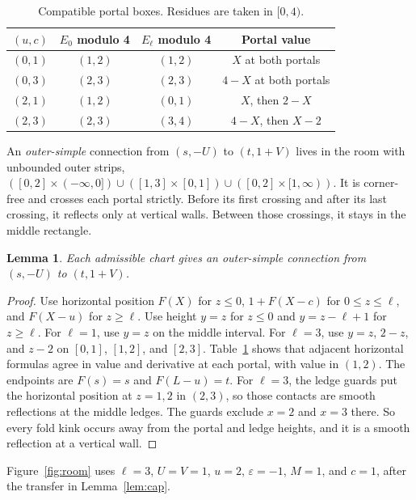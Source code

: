 \documentclass[11pt]{article}
\newtheorem{lemma}{Lemma}
\theoremstyle{remark}
\begin{document}
\begin{table}[ht]
\centering
\begin{tabular}{cccc}
\hline
$(u,c)$ & $E_0$ modulo 4 & $E_\ell$ modulo 4 & Portal value\\
\hline
$(0,1)$ & $(1,2)$ & $(1,2)$ & $X$ at both portals\\
$(0,3)$ & $(2,3)$ & $(2,3)$ & $4-X$ at both portals\\
$(2,1)$ & $(1,2)$ & $(0,1)$ & $X$, then $2-X$\\
$(2,3)$ & $(2,3)$ & $(3,4)$ & $4-X$, then $X-2$\\
\hline
\end{tabular}
\caption{Compatible portal boxes. Residues are taken in $[0,4)$.}
\label{tab:boxes}
\end{table}

An \emph{outer-simple} connection from $(s,-U)$ to $(t,1+V)$ lives in the room with unbounded outer strips, $([0,2]\times(-\infty,0])\cup([1,3]\times[0,1])\cup([0,2]\times[1,\infty))$. It is corner-free and crosses each portal strictly. Before its first crossing and after its last crossing, it reflects only at vertical walls. Between those crossings, it stays in the middle rectangle.

\begin{lemma}\label{lem:chart}
Each admissible chart gives an outer-simple connection from $(s,-U)$ to $(t,1+V)$.
\end{lemma}
\begin{proof}
Use horizontal position $F(X)$ for $z\le0$, $1+F(X-c)$ for $0\le z\le\ell$, and $F(X-u)$ for $z\ge\ell$. Use height $y=z$ for $z\le 0$ and $y=z-\ell+1$ for $z\ge\ell$. For $\ell=1$, use $y=z$ on the middle interval. For $\ell=3$, use $y=z$, $2-z$, and $z-2$ on $[0,1]$, $[1,2]$, and $[2,3]$. Table~\ref{tab:boxes} shows that adjacent horizontal formulas agree in value and derivative at each portal, with value in $(1,2)$. The endpoints are $F(s)=s$ and $F(L-u)=t$. For $\ell=3$, the ledge guards put the horizontal position at $z=1,2$ in $(2,3)$, so those contacts are smooth reflections at the middle ledges. The guards exclude $x=2$ and $x=3$ there. So every fold kink occurs away from the portal and ledge heights, and it is a smooth reflection at a vertical wall.
\end{proof}

Figure~\ref{fig:room} uses $\ell=3$, $U=V=1$, $u=2$, $\varepsilon=-1$, $M=1$, and $c=1$, after the transfer in Lemma~\ref{lem:cap}.
\end{document}
